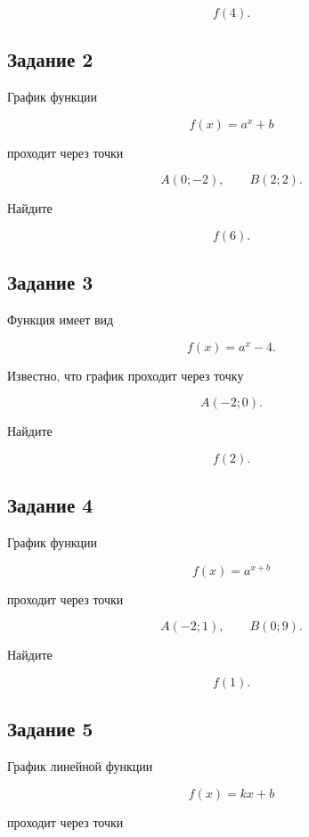 \documentclass[a4paper,12pt]{article}
\begin{document}
\[
f(4).
\]

\vspace{5mm}

\subsection*{\textcolor{accent}{Задание 2}}

График функции

\[
f(x)=a^x+b
\]

проходит через точки

\[
A(0;-2),
\qquad
B(2;2).
\]

Найдите

\[
f(6).
\]

\vspace{5mm}

\subsection*{\textcolor{accent}{Задание 3}}

Функция имеет вид

\[
f(x)=a^x-4.
\]

Известно, что график проходит через точку

\[
A(-2;0).
\]

Найдите

\[
f(2).
\]

\vspace{5mm}

\subsection*{\textcolor{accent}{Задание 4}}

График функции

\[
f(x)=a^{x+b}
\]

проходит через точки

\[
A(-2;1),
\qquad
B(0;9).
\]

Найдите

\[
f(1).
\]

\vspace{5mm}

\subsection*{\textcolor{accent}{Задание 5}}

График линейной функции

\[
f(x)=kx+b
\]

проходит через точки
\end{document}
